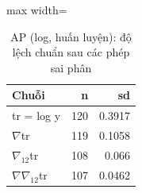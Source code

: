 \begin{table}[H]
\centering\footnotesize
\caption{AP (log, huấn luyện): độ lệch chuẩn sau các phép sai phân}\label{tab:tab_b12_10_sd}
\begin{adjustbox}{max width=\linewidth}
\begin{tabular}{|l|r|r|}
\toprule
Chuỗi & n & sd \\
\midrule
tr = log y & 120 & 0.3917 \\
$\nabla$tr & 119 & 0.1058 \\
$\nabla_{12}$tr & 108 & 0.066 \\
$\nabla\nabla_{12}$tr & 107 & 0.0462 \\
\bottomrule
\end{tabular}
\end{adjustbox}
\end{table}
